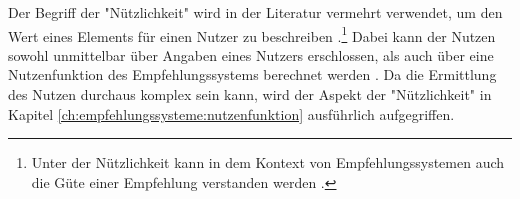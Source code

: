 Der Begriff der "Nützlichkeit" wird in der Literatur vermehrt verwendet, um den Wert eines Elements für einen Nutzer zu beschreiben \cite[S. 10f.]{ricci:inbook}\cite[S. 1]{klahold:book}\cite[S. 735]{adomavicius:inproceedings}.\footnote{Unter der Nützlichkeit kann in dem Kontext von Empfehlungssystemen auch die Güte einer Empfehlung verstanden werden \cite[S. 37ff.]{klahold:book}.}
Dabei kann der Nutzen sowohl unmittelbar über Angaben eines Nutzers erschlossen, als auch über eine Nutzenfunktion des Empfehlungssystems berechnet werden \cite[S. 735]{adomavicius:inproceedings}.
Da die Ermittlung des Nutzen durchaus komplex sein kann, wird der Aspekt der "Nützlichkeit" in Kapitel \ref{ch:empfehlungssysteme:nutzenfunktion} ausführlich aufgegriffen.

